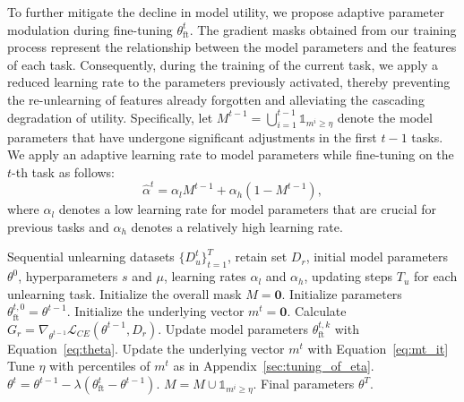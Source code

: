 \documentclass{article}
\theoremstyle{plain}
\theoremstyle{definition}
\theoremstyle{remark}
\newcommand{\method}{\texttt{ALKN}}
\begin{document}
To further mitigate the decline in model utility, we propose adaptive parameter modulation during fine-tuning $\theta_{\text{ft}}^{t}$.
The gradient masks obtained from our training process represent the relationship between the model parameters and the features of each task.
Consequently, during the training of the current task, we apply a reduced learning rate to the parameters previously activated, thereby preventing the re-unlearning of features already forgotten and alleviating the cascading degradation of utility.
Specifically, let $M^{t-1}=\bigcup_{i=1}^{t-1} \mathds{1}_{m^i\geq\eta}$ denote the model parameters that have undergone significant adjustments in the first $t-1$ tasks. We apply an adaptive learning rate to model parameters while fine-tuning on the $t$-th task as follows:
\begin{equation}
	\hat{\alpha}^t=\alpha_l M^{t-1}+\alpha_h (1-M^{t-1}),
\end{equation}
where $\alpha_l$ denotes a low learning rate for model parameters that are crucial for previous tasks and $\alpha_h$ denotes a relatively high learning rate.

\begin{algorithm}[t!]
   \caption{Continual unlearning method \method}
   \label{alg:ours}
\begin{algorithmic}
    Sequential unlearning datasets $\{D_u^t\}_{t=1}^T$, retain set $D_r$, initial model parameters $\theta^0$, hyperparameters $s$ and $\mu$, learning rates $\alpha_l$ and $\alpha_h$, updating steps $T_u$ for each unlearning task.
   \STATE Initialize the overall mask $M=\mathbf{0}$.
        \STATE Initialize parameters $\theta^{t,0}_\text{ft}=\theta^{t-1}$.
        \STATE Initialize the underlying vector $m^t=\mathbf{0}$.
        \STATE Calculate $G_r=\nabla_{\theta^{t-1}}\mathcal{L}_{CE}(\theta^{t-1}, D_r)$.
            \STATE Update model parameters $\theta_{\text{ft}}^{t,k}$ with Equation~\ref{eq:theta}.
            \STATE Update the underlying vector $m^t$ with Equation~\ref{eq:mt_it}
            \STATE Tune $\eta$ with percentiles of $m^t$ as in Appendix~\ref{sec:tuning_of_eta}.
        \ENDFOR
        \STATE $\theta^{t}=\theta^{t-1}-\lambda(\theta_{\text{ft}}^{t}-\theta^{t-1})$.
        \STATE $M=M\cup\mathds{1}_{m^i\geq\eta}$.
   \ENDFOR
    Final parameters $\theta^T$.
\end{algorithmic}
\end{algorithm}
\end{document}
